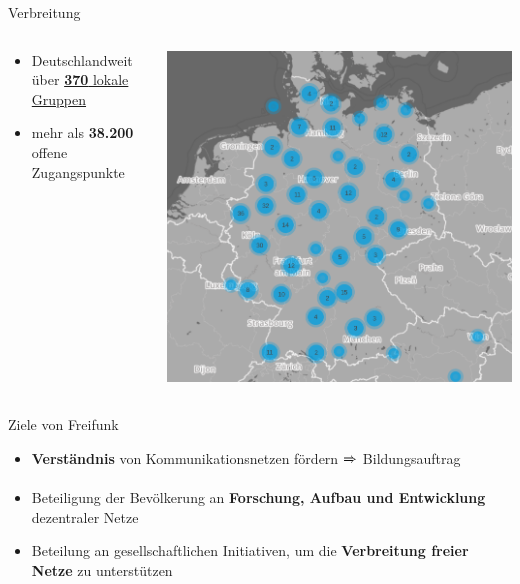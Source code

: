 \documentclass[t]{beamer}
\begin{document}
  \begin{frame}{Verbreitung}
    \begin{columns}
      \begin{column}{0.6\textwidth}
        \begin{itemize}
          \item Deutschlandweit über  \href{http://freifunk.net/wie-mache-ich-mit/community-finden/}{\textbf{370} lokale Gruppen}
          \item mehr als \textbf{38.200} offene Zugangspunkte


        \end{itemize}
      \end{column}
      \begin{column}{0.4\textwidth}
        \begin{center}
          \includegraphics[width=\textwidth]{images/2016-06-01_map-de}
        \end{center}
      \end{column}
    \end{columns}
  \end{frame}

  \begin{frame}{Ziele von Freifunk}
    \begin{itemize}
      \item \textbf{Verständnis} von Kommunikationsnetzen fördern $\xRightarrow{}$ Bildungsauftrag
      \item Beteiligung der Bevölkerung an \textbf{Forschung, Aufbau und Entwicklung} dezentraler Netze
      \item Beteilung an gesellschaftlichen Initiativen, um die \textbf{Verbreitung freier Netze} zu unterstützen
    \end{itemize}
  \end{frame}
\end{document}
